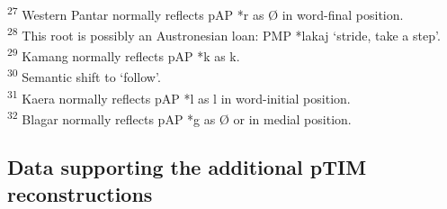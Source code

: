 \documentclass[output=paper]{LSP/langsci}
\begin{document}
\\
\textsuperscript{27} Western Pantar normally reflects pAP *r as {\O} in word-final position. 
\\
\textsuperscript{28} This root is possibly an Austronesian loan: PMP *lakaj `stride, take a step'. 
\\
\textsuperscript{29} Kamang normally reflects pAP *k as k. 
\\
\textsuperscript{30} Semantic shift to `follow'. 
\\
\textsuperscript{31} Kaera normally reflects pAP *l as l in word-initial position.
\\
\textsuperscript{32} Blagar normally reflects pAP *g as {\O} or {\textglotstop} in medial position.



\subsection{Data supporting the additional pTIM reconstructions}
\end{document}
